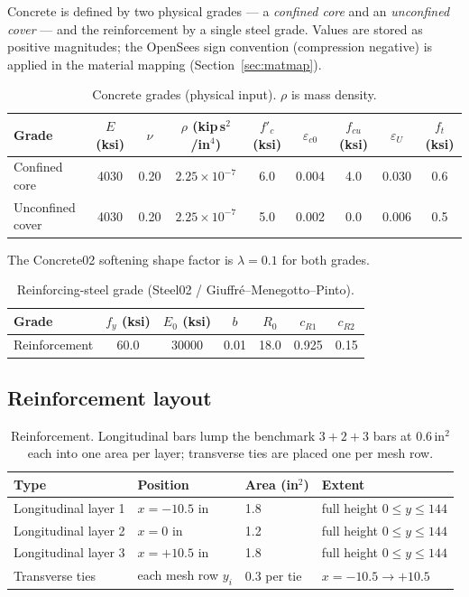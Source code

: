 \documentclass[11pt]{article}
\newcommand{\unit}[1]{\,\mathrm{#1}}
\begin{document}
Concrete is defined by two physical grades --- a \emph{confined core} and an \emph{unconfined
cover} --- and the reinforcement by a single steel grade. Values are stored as positive
magnitudes; the OpenSees sign convention (compression negative) is applied in the material
mapping (Section~\ref{sec:matmap}).

\begin{table}[H]
\centering
\caption{Concrete grades (physical input). $\rho$ is mass density.}
\begin{tabular}{l c c c c c c c c}
\toprule
Grade & $E$ (ksi) & $\nu$ & $\rho$ (kip\,s$^2$/in$^4$) & $f'_c$ (ksi) & $\varepsilon_{c0}$ & $f_{cu}$ (ksi) & $\varepsilon_{U}$ & $f_t$ (ksi) \\
\midrule
Confined core    & 4030 & 0.20 & $2.25\times10^{-7}$ & 6.0 & 0.004 & 4.0 & 0.030 & 0.6 \\
Unconfined cover & 4030 & 0.20 & $2.25\times10^{-7}$ & 5.0 & 0.002 & 0.0 & 0.006 & 0.5 \\
\bottomrule
\end{tabular}
\end{table}

The Concrete02 softening shape factor is $\lambda = 0.1$ for both grades.

\begin{table}[H]
\centering
\caption{Reinforcing-steel grade (Steel02 / Giuffr\'e--Menegotto--Pinto).}
\begin{tabular}{l c c c c c c}
\toprule
Grade & $f_y$ (ksi) & $E_0$ (ksi) & $b$ & $R_0$ & $c_{R1}$ & $c_{R2}$ \\
\midrule
Reinforcement & 60.0 & 30000 & 0.01 & 18.0 & 0.925 & 0.15 \\
\bottomrule
\end{tabular}
\end{table}

\subsection{Reinforcement layout}

\begin{table}[H]
\centering
\caption{Reinforcement. Longitudinal bars lump the benchmark $3{+}2{+}3$ bars at
$0.6\unit{in^2}$ each into one area per layer; transverse ties are placed one per mesh row.}
\begin{tabular}{l l l l}
\toprule
Type & Position & Area (in$^2$) & Extent \\
\midrule
Longitudinal layer 1 & $x=-10.5$ in & 1.8 & full height $0\le y\le 144$ \\
Longitudinal layer 2 & $x=0$ in     & 1.2 & full height $0\le y\le 144$ \\
Longitudinal layer 3 & $x=+10.5$ in & 1.8 & full height $0\le y\le 144$ \\
Transverse ties      & each mesh row $y_i$ & 0.3 per tie & $x=-10.5 \to +10.5$ \\
\bottomrule
\end{tabular}
\end{table}
\end{document}
